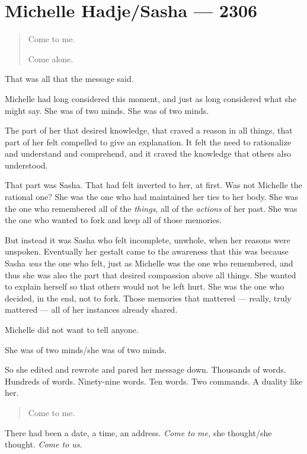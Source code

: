 \hypertarget{michelle-hadjesasha-2306}{%
\chapter{Michelle Hadje/Sasha — 2306}\label{michelle-hadjesasha-2306}}

\begin{quote}
Come to me.

Come alone.
\end{quote}

That was all that the message said.

Michelle had long considered this moment, and just as long considered what she might say. She was of two minds. She was of two minds.

The part of her that desired knowledge, that craved a reason in all things, that part of her felt compelled to give an explanation. It felt the need to rationalize and understand and comprehend, and it craved the knowledge that others also understood.

That part was Sasha. That had felt inverted to her, at first. Was not Michelle the rational one? She was the one who had maintained her ties to her body. She was the one who remembered all of the \emph{things}, all of the \emph{actions} of her past. She was the one who wanted to fork and keep all of those memories.

But instead it was Sasha who felt incomplete, unwhole, when her reasons were unspoken. Eventually her gestalt came to the awareness that this was because Sasha \emph{was} the one who felt, just as Michelle was the one who remembered, and thus she was also the part that desired compassion above all things. She wanted to explain herself so that others would not be left hurt. She was the one who decided, in the end, not to fork. Those memories that mattered — really, truly mattered — all of her instances already shared.

Michelle did not want to tell anyone.

She was of two minds/she was of two minds.

So she edited and rewrote and pared her message down. Thousands of words. Hundreds of words. Ninety-nine words. Ten words. Two commands. A duality like her.

\begin{quote}
Come to me.
\end{quote}

There had been a date, a time, an address. \emph{Come to me,} she thought/she thought. \emph{Come to us.}

